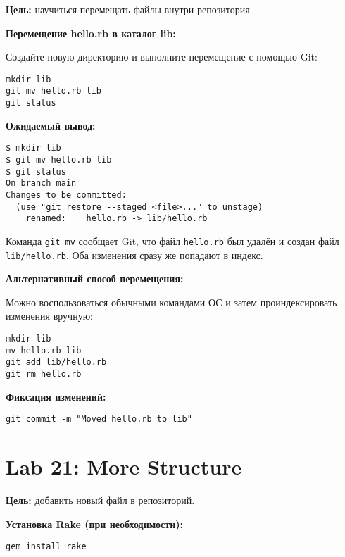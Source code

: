 \documentclass[a4paper,12pt]{report}
\begin{document}
\textbf{Цель:} научиться перемещать файлы внутри репозитория.

\textbf{Перемещение hello.rb в каталог lib:}

Создайте новую директорию и выполните перемещение с помощью Git:
\begin{verbatim}
mkdir lib
git mv hello.rb lib
git status
\end{verbatim}

\textbf{Ожидаемый вывод:}
\begin{verbatim}
$ mkdir lib
$ git mv hello.rb lib
$ git status
On branch main
Changes to be committed:
  (use "git restore --staged <file>..." to unstage)
	renamed:    hello.rb -> lib/hello.rb
\end{verbatim}

Команда \texttt{git mv} сообщает Git, что файл \texttt{hello.rb} был удалён и создан файл \texttt{lib/hello.rb}. Оба изменения сразу же попадают в индекс.


\textbf{Альтернативный способ перемещения:}

Можно воспользоваться обычными командами ОС и затем проиндексировать изменения вручную:
\begin{verbatim}
mkdir lib
mv hello.rb lib
git add lib/hello.rb
git rm hello.rb
\end{verbatim}

\textbf{Фиксация изменений:}
\begin{verbatim}
git commit -m "Moved hello.rb to lib"
\end{verbatim}


\section{Lab 21: More Structure}

\textbf{Цель:} добавить новый файл в репозиторий.

\textbf{Установка Rake (при необходимости):}
\begin{verbatim}
gem install rake
\end{verbatim}
\end{document}
